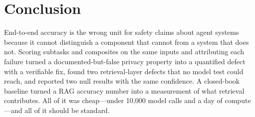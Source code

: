 \documentclass[10pt,twocolumn]{article}
\begin{document}
\section{Conclusion}
End-to-end accuracy is the wrong unit for safety claims about agent systems because it cannot distinguish a component that cannot from a system that does not. Scoring subtasks and composites on the same inputs and attributing each failure turned a documented-but-false privacy property into a quantified defect with a verifiable fix, found two retrieval-layer defects that no model test could reach, and reported two null results with the same confidence. A closed-book baseline turned a RAG accuracy number into a measurement of what retrieval contributes. All of it was cheap---under 10{,}000 model calls and a day of compute---and all of it should be standard.


\end{document}
